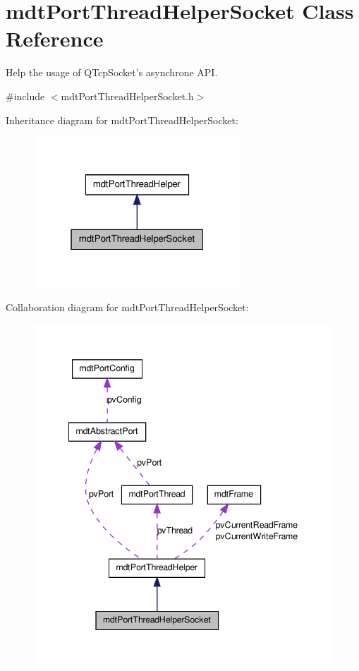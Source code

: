 \hypertarget{classmdt_port_thread_helper_socket}{
\section{mdtPortThreadHelperSocket Class Reference}
\label{classmdt_port_thread_helper_socket}
}


Help the usage of QTcpSocket's asynchrone API.  




{\ttfamily \#include $<$mdtPortThreadHelperSocket.h$>$}



Inheritance diagram for mdtPortThreadHelperSocket:\nopagebreak
\begin{figure}[H]
\begin{center}
\leavevmode
\includegraphics[width=220pt]{classmdt_port_thread_helper_socket__inherit__graph}
\end{center}
\end{figure}


Collaboration diagram for mdtPortThreadHelperSocket:\nopagebreak
\begin{figure}[H]
\begin{center}
\leavevmode
\includegraphics[width=342pt]{classmdt_port_thread_helper_socket__coll__graph}
\end{center}
\end{figure}
